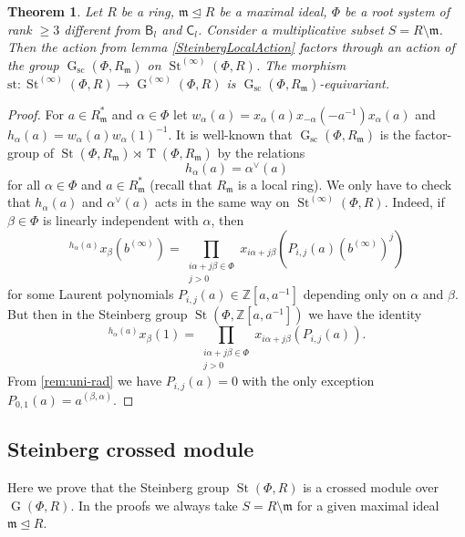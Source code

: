 \documentclass{article}
\numberwithin{equation}{section}
\newtheorem{theorem}{Theorem}
\theoremstyle{definition}
\theoremstyle{remark}
\DeclareMathOperator\St{St}
\DeclareMathOperator\GG{G}
\DeclareMathOperator\Torus{T}
\newcommand{\up}[2]{{^{#1}\!{#2}}}
\newcommand{\rB}{\mathsf{B}}
\newcommand{\rC}{\mathsf{C}}
\begin{document}
\begin{theorem}\label{ChevalleyLocalAction}
 Let \(R\) be a ring, \(\mathfrak m \trianglelefteq R\) be a maximal ideal, \(\Phi\) be a root system of rank \(\geq 3\) different from \(\rB_l\) and \(\rC_l\). Consider a multiplicative subset \(S = R \setminus \mathfrak m\). Then the action from lemma \ref{SteinbergLocalAction} factors through an action of the group \(\GG_{\mathrm{sc}}(\Phi, R_{\mathfrak m})\) on \(\St^{(\infty)}(\Phi, R)\). The morphism \(\mathrm{st} \colon \St^{(\infty)}(\Phi, R) \to \GG^{(\infty)}(\Phi, R)\) is \(\GG_{\mathrm{sc}}(\Phi, R_{\mathfrak m})\)-equivariant.
\end{theorem}
\begin{proof}
 For \(a \in R_{\mathfrak m}^*\) and \(\alpha \in \Phi\) let \(w_\alpha(a) = x_\alpha(a) x_{-\alpha}(-a^{-1}) x_\alpha(a)\) and \(h_\alpha(a) = w_\alpha(a) w_\alpha(1)^{-1}\). It is well-known that \(\GG_{\mathrm{sc}}(\Phi, R_{\mathfrak m})\) is the factor-group of \(\St(\Phi, R_{\mathfrak m}) \rtimes \Torus(\Phi, R_{\mathfrak m})\) by the relations
 \[h_\alpha(a) = \alpha^\vee(a)\]
 for all \(\alpha \in \Phi\) and \(a \in R_{\mathfrak m}^*\) (recall that \(R_{\mathfrak m}\) is a local ring). We only have to check that \(h_\alpha(a)\) and \(\alpha^\vee(a)\) acts in the same way on \(\St^{(\infty)}(\Phi, R)\). Indeed, if \(\beta \in \Phi\) is linearly independent with \(\alpha\), then
 \[\up{h_\alpha(a)}{x_\beta(b^{(\infty)})} = \prod_{\substack{i\alpha + j\beta \in \Phi\\ j > 0}} x_{i\alpha + j\beta}(P_{i, j}(a) (b^{(\infty)})^j)\]
 for some Laurent polynomials \(P_{i, j}(a) \in \mathbb Z[a, a^{-1}]\) depending only on \(\alpha\) and \(\beta\). But then in the Steinberg group \(\St(\Phi, \mathbb Z[a, a^{-1}])\) we have the identity
 \[\up{h_\alpha(a)}{x_\beta(1)} = \prod_{\substack{i\alpha + j\beta \in \Phi\\ j > 0}} x_{i\alpha + j\beta}(P_{i, j}(a)).\]
 From \cref{rem:uni-rad} we have \(P_{i, j}(a) = 0\) with the only exception \(P_{0, 1}(a) = a^{(\beta, \alpha)}\).
\end{proof}

\subsection{Steinberg crossed module}

Here we prove that the Steinberg group \(\St(\Phi, R)\) is a crossed module over \(\GG(\Phi, R)\). In the proofs we always take \(S = R \setminus \mathfrak m\) for a given maximal ideal \(\mathfrak m \trianglelefteq R\).
\end{document}

